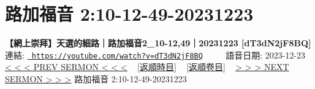 \documentclass{book}
\begin{document}
\section{路加福音 2:10-12-49-20231223}
\label{sec:dT3dN2jF8BQ}
\textbf{【網上崇拜】天選的細路｜路加福音2\_10-12,49｜20231223 [dT3dN2jF8BQ]}
\newline
\newline
連結: \href{https://youtube.com/watch?v=dT3dN2jF8BQ}{\texttt{ https://youtube.com/watch?v=dT3dN2jF8BQ}} ~~~~ 語音日期: 2023-12-23 
\newline
\newline
\hyperref[sec:sKBDQD8UIMg]{\small{< < < PREV SERMON < < <}}
~
\hyperref[sec:index_chronic]{\small{[返順時目]}}
~
\hyperref[sec:index_scriptual]{\small{[返順卷目]}}
~
\hyperref[sec:9ztySs_vnP4]{\small{> > > NEXT SERMON > > >}}
\newline
\newline
路加福音 2:10-12-49-20231223
\newline
\end{document}
